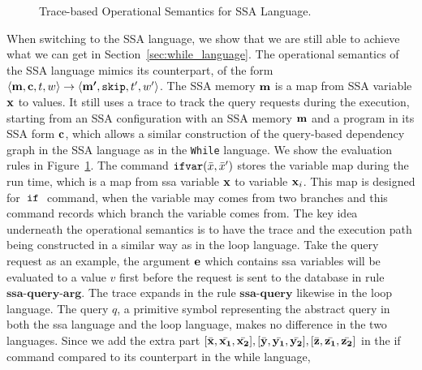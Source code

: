 {\begin{figure}
{
}
      \caption{Trace-based Operational Semantics for SSA Language.}
      \label{fig:os_ssa}
  \end{figure}
%
{
When switching to the SSA language, we show that we are still able to achieve what we can get in Section~\ref{sec:while_language}. 
The operational semantics of the SSA language mimics its counterpart, of the form $\langle {\boldsymbol{\mathbf{m}}}, {\boldsymbol{\mathbf{c}}}, t, w \rangle \to \langle {\boldsymbol{\mathbf{m'}}}, \mathtt{skip}, t', w' \rangle$. 
The SSA memory ${\boldsymbol{\mathbf{m}}}$ is a map from SSA variable ${\boldsymbol{\mathbf{x}}}$ to values.
It still uses a trace to track the query requests during the execution, starting from an SSA configuration with an SSA memory ${\boldsymbol{\mathbf{m}}}$ and a program in its SSA form ${\boldsymbol{\mathbf{c}}}$, 
which allows a similar construction of the query-based dependency graph in the SSA language as in the {\tt While} language.
We show the evaluation rules in Figure~\ref{fig:os_ssa}.
}
%
The command 
$\mathsf{\mathtt{ifvar}}(\bar{x},\bar{x}')$ stores the variable map during the run time, which is a map from ssa variable ${\boldsymbol{\mathbf{x}}}$ to variable ${\boldsymbol{\mathbf{x}}}_i$. 
This map is designed for $\;\mathtt{if}\;$ command, when the variable may comes from two branches and this command records which branch the variable comes from. 
%
%
{
The key idea underneath the operational semantics is to have the trace and the execution path being constructed in a similar way as in the loop language.
Take the query request as an example, the argument ${\boldsymbol{\mathbf{e}}}$ which contains ssa variables will be evaluated to a value $v$ first before the request is sent to the database in rule $\textbf{ssa-query-arg}$. 
The trace expands in the rule $\textbf{ssa-query}$ likewise in the loop language. 
The query $q$, a primitive symbol representing the abstract query in both the ssa language and  the loop language, makes no difference in the two languages. 
Since we add the extra part $[\bar{{\boldsymbol{\mathbf{x}}}}, \bar{{\boldsymbol{\mathbf{x_1}}}}, \bar{{\boldsymbol{\mathbf{x_2}}}}] ,[\bar{{\boldsymbol{\mathbf{y}}}}, \bar{{\boldsymbol{\mathbf{y_1}}}}, \bar{{\boldsymbol{\mathbf{y_2}}}}] ,[\bar{{\boldsymbol{\mathbf{z}}}},\bar{{\boldsymbol{\mathbf{z_1}}}}, \bar{{\boldsymbol{\mathbf{z_2}}}}]  $ 
in the if command compared to its counterpart in the while language, 
}}
